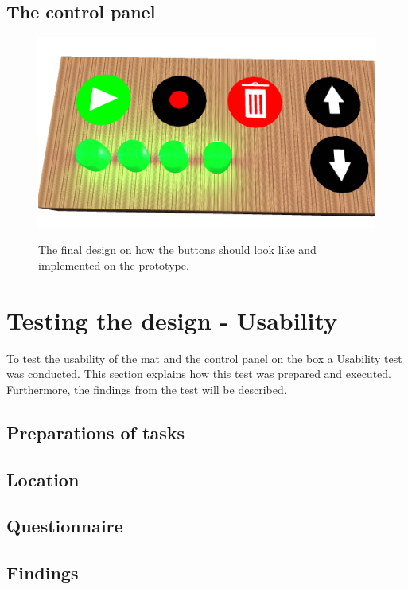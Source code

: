 \subsection{The control panel}

\begin{figure}[H]
	\centering
	\includegraphics[width=0.7\linewidth]{figure/Design/buttonDesign}
	\label{fig:buttonDesign}
	\caption{The final design on how the buttons should look like and implemented on the prototype.}	
\end{figure}






\section{Testing the design - Usability}
To test the usability of the mat and the control panel on the box a Usability test was conducted. This section explains how this test was prepared and executed. Furthermore, the findings from the test will be described.

\subsection{Preparations of tasks}

\subsection{Location}

\subsection{Questionnaire}

\subsection{Findings}

